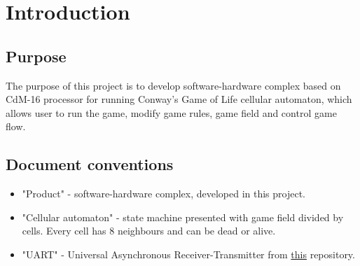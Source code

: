 \chapter*{Introduction}

\section*{Purpose}

The purpose of this project is to develop software-hardware complex based on CdM-16 processor for running Conway's Game of Life cellular automaton, which allows user to run the game, modify game rules, game field and control game flow.

\section*{Document conventions}

\begin{itemize}
	\item "Product" - software-hardware complex, developed in this project.
	\item "Cellular automaton" - state machine presented with game field divided by cells. Every cell has 8 neighbours and can be dead or alive.
	\item "UART" - Universal Asynchronous Receiver-Transmitter from \href{https://github.com/cdm-processors/logisim-uart}{this} repository.
\end{itemize}
